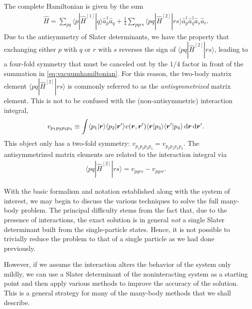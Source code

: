 The complete Hamiltonian is given by the sum
\begin{align}
  \hat{H} = \sum_{p q} \langle p | \hat{H}^{[1]} | q \rangle \hat{a}_p^\dagger \hat{a}_q + \frac{1}{4} \sum_{p q r s} \langle p q | \hat{H}^{[2]} | r s \rangle \hat{a}_p^\dagger \hat{a}_q^\dagger \hat{a}_s \hat{a}_r. \label{eq:vacuumhamiltonian}
\end{align}
Due to the antisymmetry of Slater determinants, we have the property
that exchanging either $p$ with $q$ or $r$ with $s$ reverses the sign
of $\langle p q | \hat{H}^{[2]} | r s \rangle$, leading to a four-fold
symmetry that must be canceled out by the $1/4$ factor in front of the
summation in \eqref{eq:vacuumhamiltonian}.  For this reason, the
two-body matrix element $\langle p q | \hat{H}^{[2]} | r s \rangle$ is
commonly referred to as the \emph{antisymmetrized} matrix element.
This is not to be confused with the (non-antisymmetric) interaction
integral,
\begin{align} \label{eq:interactionintegral}
  v_{p_1 p_2 p_3 p_4} \equiv \int \langle p_1 | \bm{r} \rangle \langle p_2 | \bm{r}' \rangle v(\bm r, \bm r') \langle \bm{r} | p_3 \rangle \langle \bm{r}' | p_4 \rangle \operatorname{d\!} \bm{r} \operatorname{d\!} \bm{r}'.
\end{align}
This object only has a two-fold symmetry: $v_{p_1 p_2 p_3 p_4} = v_{p_2 p_1 p_4 p_3}$.  The antisymmetrized matrix elements are related to the interaction integral via
\begin{align} \label{eq:antisymmetricmatrixelement}
  \langle p q | \hat{H}^{[2]} | r s \rangle = v_{p q r s} - v_{p q s r}.
\end{align}

With the basic formalism and notation established along with the
system of interest, we may begin to discuss the various techniques to
solve the full many-body problem.  The principal difficulty stems from
the fact that, due to the presence of interactions, the exact solution
is in general \emph{not} a single Slater determinant built from the
single-particle states.  Hence, it is not possible to trivially reduce
the problem to that of a single particle as we had done previously.

However, if we assume the interaction alters the behavior of the
system only mildly, we can use a Slater determinant of the
noninteracting system as a starting point and then apply various
methods to improve the accuracy of the solution.  This is a general
strategy for many of the many-body methods that we shall describe.

